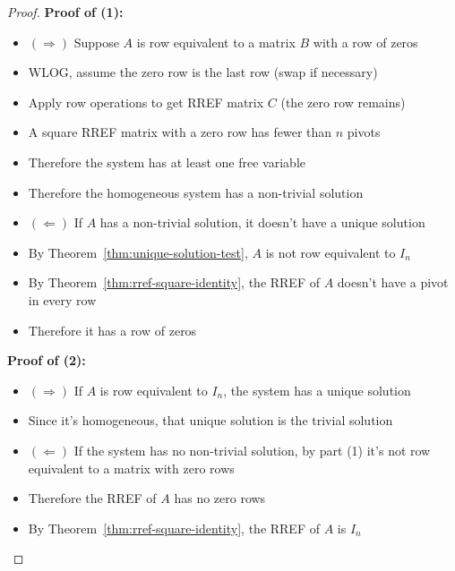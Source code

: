 \begin{proof}
    \textbf{Proof of (1):}
    \begin{itemize}
        \item $(\Rightarrow)$ Suppose $A$ is row equivalent to a matrix $B$ with a row of zeros
        \item WLOG, assume the zero row is the last row (swap if necessary)
        \item Apply row operations to get RREF matrix $C$ (the zero row remains)
        \item A square RREF matrix with a zero row has fewer than $n$ pivots
        \item Therefore the system has at least one free variable
        \item Therefore the homogeneous system has a non-trivial solution
        \item $(\Leftarrow)$ If $A$ has a non-trivial solution, it doesn't have a unique solution
        \item By Theorem~\ref{thm:unique-solution-test}, $A$ is not row equivalent to $I_n$
        \item By Theorem~\ref{thm:rref-square-identity}, the RREF of $A$ doesn't have a pivot in every row
        \item Therefore it has a row of zeros
    \end{itemize}
    
    \textbf{Proof of (2):}
    \begin{itemize}
        \item $(\Rightarrow)$ If $A$ is row equivalent to $I_n$, the system has a unique solution
        \item Since it's homogeneous, that unique solution is the trivial solution
        \item $(\Leftarrow)$ If the system has no non-trivial solution, by part (1) it's not row equivalent to a matrix with zero rows
        \item Therefore the RREF of $A$ has no zero rows
        \item By Theorem~\ref{thm:rref-square-identity}, the RREF of $A$ is $I_n$
    \end{itemize}
\end{proof}